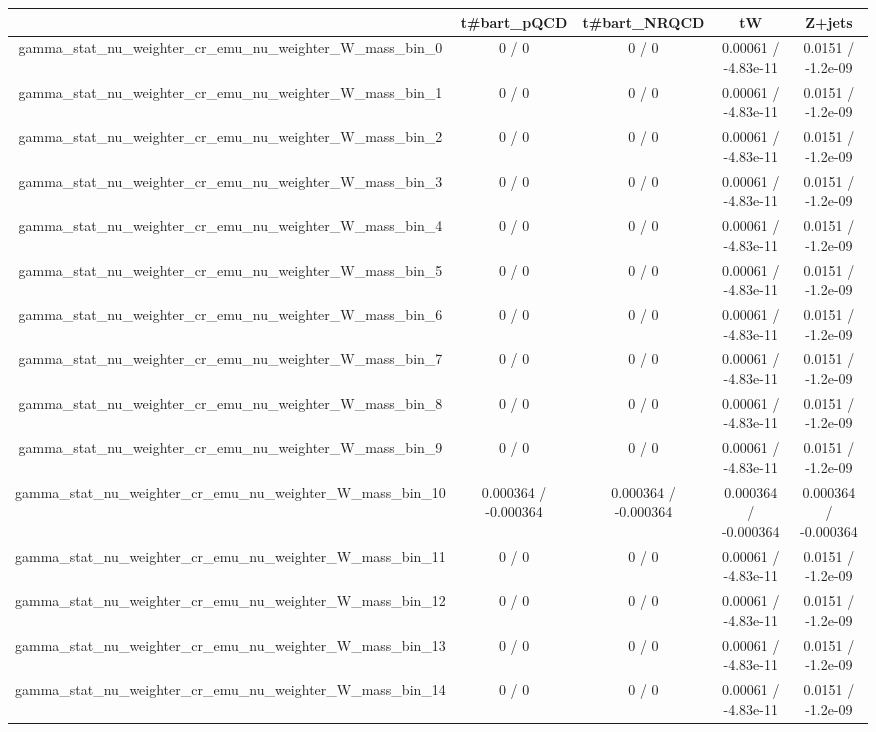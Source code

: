 \documentclass[10pt]{article}
\begin{document}
\begin{table}[htbp]
\begin{center}
\begin{tabular}{|c|c|c|c|c|}
\hline 
      & t#bar{t}_{pQCD}      & t#bar{t}_{NRQCD}      & tW      & Z+jets \\ 
\hline 
  gamma_stat_nu_weighter_cr_emu_nu_weighter_W_mass_bin_0 & 0 / 0 & 0 / 0 & 0.00061 / -4.83e-11 & 0.0151 / -1.2e-09 \\ 
  gamma_stat_nu_weighter_cr_emu_nu_weighter_W_mass_bin_1 & 0 / 0 & 0 / 0 & 0.00061 / -4.83e-11 & 0.0151 / -1.2e-09 \\ 
  gamma_stat_nu_weighter_cr_emu_nu_weighter_W_mass_bin_2 & 0 / 0 & 0 / 0 & 0.00061 / -4.83e-11 & 0.0151 / -1.2e-09 \\ 
  gamma_stat_nu_weighter_cr_emu_nu_weighter_W_mass_bin_3 & 0 / 0 & 0 / 0 & 0.00061 / -4.83e-11 & 0.0151 / -1.2e-09 \\ 
  gamma_stat_nu_weighter_cr_emu_nu_weighter_W_mass_bin_4 & 0 / 0 & 0 / 0 & 0.00061 / -4.83e-11 & 0.0151 / -1.2e-09 \\ 
  gamma_stat_nu_weighter_cr_emu_nu_weighter_W_mass_bin_5 & 0 / 0 & 0 / 0 & 0.00061 / -4.83e-11 & 0.0151 / -1.2e-09 \\ 
  gamma_stat_nu_weighter_cr_emu_nu_weighter_W_mass_bin_6 & 0 / 0 & 0 / 0 & 0.00061 / -4.83e-11 & 0.0151 / -1.2e-09 \\ 
  gamma_stat_nu_weighter_cr_emu_nu_weighter_W_mass_bin_7 & 0 / 0 & 0 / 0 & 0.00061 / -4.83e-11 & 0.0151 / -1.2e-09 \\ 
  gamma_stat_nu_weighter_cr_emu_nu_weighter_W_mass_bin_8 & 0 / 0 & 0 / 0 & 0.00061 / -4.83e-11 & 0.0151 / -1.2e-09 \\ 
  gamma_stat_nu_weighter_cr_emu_nu_weighter_W_mass_bin_9 & 0 / 0 & 0 / 0 & 0.00061 / -4.83e-11 & 0.0151 / -1.2e-09 \\ 
  gamma_stat_nu_weighter_cr_emu_nu_weighter_W_mass_bin_10 & 0.000364 / -0.000364 & 0.000364 / -0.000364 & 0.000364 / -0.000364 & 0.000364 / -0.000364 \\ 
  gamma_stat_nu_weighter_cr_emu_nu_weighter_W_mass_bin_11 & 0 / 0 & 0 / 0 & 0.00061 / -4.83e-11 & 0.0151 / -1.2e-09 \\ 
  gamma_stat_nu_weighter_cr_emu_nu_weighter_W_mass_bin_12 & 0 / 0 & 0 / 0 & 0.00061 / -4.83e-11 & 0.0151 / -1.2e-09 \\ 
  gamma_stat_nu_weighter_cr_emu_nu_weighter_W_mass_bin_13 & 0 / 0 & 0 / 0 & 0.00061 / -4.83e-11 & 0.0151 / -1.2e-09 \\ 
  gamma_stat_nu_weighter_cr_emu_nu_weighter_W_mass_bin_14 & 0 / 0 & 0 / 0 & 0.00061 / -4.83e-11 & 0.0151 / -1.2e-09 \\ 

\end{tabular}
\end{center}
\end{table}
\end{document}
